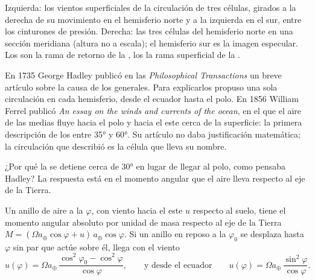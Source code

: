 \begin{omfigure}
{\small Izquierda: los vientos superficiales de la circulación de tres células, girados a la derecha de su movimiento en el hemisferio norte y a la izquierda en el sur, entre los cinturones de presión. Derecha: las tres células del hemisferio norte en una sección meridiana (altura no a escala); el hemisferio sur es la imagen especular. Los  son la rama de retorno de la , los  la rama superficial de la .}
\label{fig:b1:atmospheric-circulation:three-cells}
\end{omfigure}

\begin{history}
En 1735 George Hadley publicó en las \emph{Philosophical Transactions} un breve artículo sobre la causa de los  generales. Para explicarlos propuso una sola circulación en cada hemisferio, desde el ecuador hasta el polo.
En 1856 William Ferrel publicó \emph{An essay on the winds and currents of the ocean}, en el que el aire de las  medias fluye hacia el polo y hacia el este cerca de la superficie: la primera descripción de los  entre \ang{35} y \ang{60}. Su artículo no daba justificación matemática; la circulación que describió es la célula que lleva su nombre.
\end{history}

¿Por qué la  se detiene cerca de \ang{30} en lugar de llegar al polo, como pensaba Hadley? La respuesta está en el momento angular que el aire lleva respecto al eje de la Tierra.

\begin{proposition}\label{prop:b1:atmospheric-circulation:angular-momentum}
Un anillo de aire a la  $\varphi$, con viento hacia el este $u$ respecto al suelo,
tiene el momento angular absoluto por unidad de masa respecto al eje de la Tierra $M =
(\Omega a_\oplus\cos\varphi + u)\,a_\oplus\cos\varphi$. Si un anillo en reposo a la 
$\varphi_0$ se desplaza hasta $\varphi$ sin par que actúe sobre él, llega con el viento
\[
  u(\varphi) = \Omega a_\oplus\,\frac{\cos^2\varphi_0 - \cos^2\varphi}{\cos\varphi},
  \qquad\text{y desde el ecuador}\qquad
  u(\varphi) = \Omega a_\oplus\,\frac{\sin^2\varphi}{\cos\varphi} .
\]
\end{proposition}

